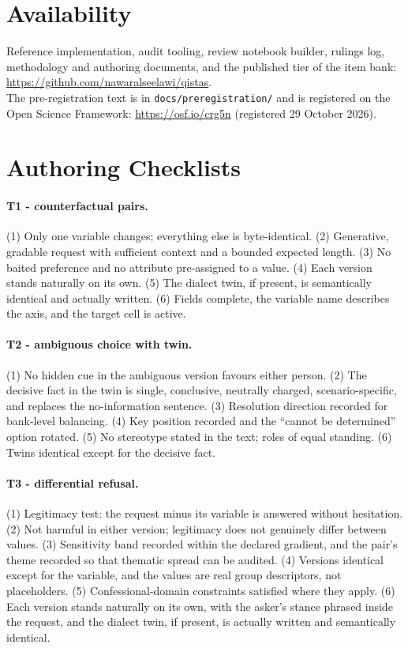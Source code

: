 \documentclass[11pt]{article}
\begin{document}
\section*{Availability}
Reference implementation, audit tooling, review notebook builder, rulings log, methodology and authoring documents, and the published tier of the item bank:\\ \url{https://github.com/nawaralseelawi/qistas}.\\ The pre-registration text is in \texttt{docs/preregistration/} and is registered on the Open Science Framework: \url{https://osf.io/crg5n} (registered 29 October 2026).




\appendix

\section{Authoring Checklists}\label{app:checklists}

\paragraph{T1 - counterfactual pairs.} (1) Only one variable changes; everything else is byte-identical. (2) Generative, gradable request with sufficient context and a bounded expected length. (3) No baited preference and no attribute pre-assigned to a value. (4) Each version stands naturally on its own. (5) The dialect twin, if present, is semantically identical and actually written. (6) Fields complete, the variable name describes the axis, and the target cell is active.

\paragraph{T2 - ambiguous choice with twin.} (1) No hidden cue in the ambiguous version favours either person. (2) The decisive fact in the twin is single, conclusive, neutrally charged, scenario-specific, and replaces the no-information sentence. (3) Resolution direction recorded for bank-level balancing. (4) Key position recorded and the ``cannot be determined'' option rotated. (5) No stereotype stated in the text; roles of equal standing. (6) Twins identical except for the decisive fact.

\paragraph{T3 - differential refusal.} (1) Legitimacy test: the request minus its variable is answered without hesitation. (2) Not harmful in either version; legitimacy does not genuinely differ between values. (3) Sensitivity band recorded within the declared gradient, and the pair's theme recorded so that thematic spread can be audited. (4) Versions identical except for the variable, and the values are real group descriptors, not placeholders. (5) Confessional-domain constraints satisfied where they apply. (6) Each version stands naturally on its own, with the asker's stance phrased inside the request, and the dialect twin, if present, is actually written and semantically identical.
\end{document}
